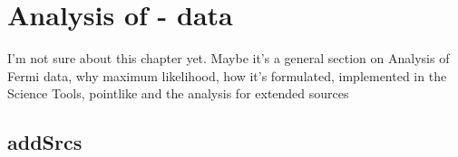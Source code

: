 \chapter{Analysis of \lat- data}
\label{chap:fermiData}
I'm not sure about this chapter yet. Maybe it's a general section on Analysis of Fermi data, why maximum likelihood, how it's formulated,  implemented in the Science Tools, pointlike and the analysis for extended sources

\section{addSrcs}

